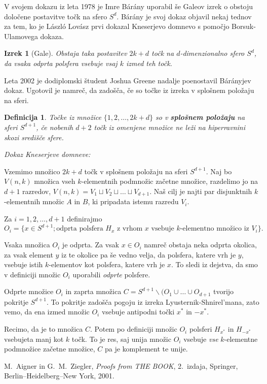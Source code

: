\documentclass[a4paper,12pt]{article}
\newtheorem{izrek}{Izrek}
\newtheorem{definicija}{Definicija}
\begin{document}
V svojem dokazu iz leta 1978 je Imre Bárány uporabil še Galeov izrek o obstoju določene postavitve točk na sfero $S^d$. Bárány je svoj dokaz objavil nekaj tednov za tem, ko je László Lovász prvi dokazal Kneserjevo domnevo s pomočjo Borsuk-Ulamovega dokaza.

\begin{izrek}[Gale]
Obstaja taka postavitev $2k+d$ točk na $d$-dimenzionalno sfero $S^d$, da vsaka odprta polsfera vsebuje vsaj $k$ izmed teh točk.
\end{izrek}

Leta 2002 je dodiplomski študent Joshua Greene nadalje poenostavil Bárányjev dokaz. Ugotovil je namreč, da zadošča, če so točke iz izreka v splošnem položaju na sferi.

\begin{definicija}
Točke iz množice $\{1,2,\ldots,2k+d\}$ so v \textbf {splošnem položaju} na sferi $S^{d+1}$, če nobenih $d+2$ točk iz omenjene množice ne leži na hiperravnini skozi središče sfere.
\end{definicija}

\noindent
{\em Dokaz Kneserjeve domneve:}

\indent Vzemimo množico $2k+d$ točk v splošnem položaju na sferi $S^{d+1}$. Naj bo $V(n,k)$ množica vseh $k$-elementnih podmnožic začetne množice, razdelimo jo na $d+1$ razredov, $V(n,k) = V_1 \sqcup V_2 \sqcup \ldots \sqcup V_{d+1}$. Naš cilj je najti par disjunktnih $k$-elementnih množic $A$ in $B$, ki pripadata istemu razredu $V_i$.

Za $i=1, 2,\ldots, d+1$ definirajmo $O_i = \{x \in S^{d+1}; \text{odprta polsfera } H_x \text{ z vrhom } x \text{ vsebuje } k\text{-elementno množico iz } V_i\}.$ %

Vsaka množica $O_i$ je odprta. Za vsak $x \in O_i$ namreč obstaja neka odprta okolica, za vsak element $y$ iz te okolice pa še vedno velja, da polsfera, katere vrh je $y$, vsebuje istih $k$-elementov kot polsfera, katere vrh je $x$. To sledi iz dejstva, da smo v definiciji množic $O_i$ uporabili {\em odprte} polsfere.

Odprte množice $O_i$ in zaprta množica $C = S^{d+1} \backslash (O_1 \cup \ldots \cup O_{d+1}$ tvorijo pokritje $S^{d+1}$. To pokritje zadošča pogoju iz izreka Lyusternik-Shnirel'mana, zato vemo, da ena izmed množic $O_i$ vsebuje antipodni točki $x^*$ in $-x^*$. 

Recimo, da je to množica $C$. Potem po definiciji množic $O_i$ polsferi $H_{x^*}$ in $H_{-x^*}$ vsebujeta manj kot $k$ točk. To je res, saj unija množic $O_i$ vsebuje {\em vse} $k$-elementne podmnožice začetne množice, $C$ pa je komplement te unije.  



\begin{thebibliography}{1}

M.~Aigner in G.~M.~Ziegler, \emph{Proofs from THE BOOK}, 2.\ izdaja, Springer, Berlin--Heidelberg--New York, 2001.

\end{thebibliography}
\end{document}
